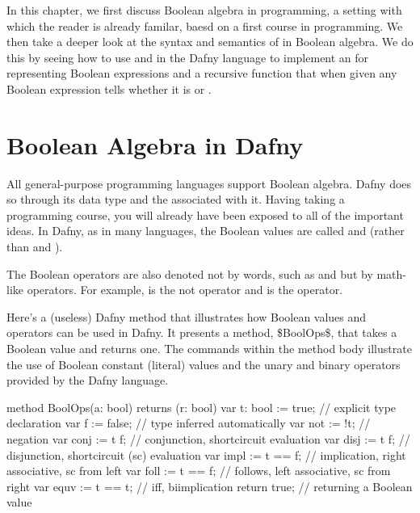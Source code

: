 \documentclass[letterpaper,10pt,english]{sphinxmanual}
\begin{document}
In this chapter, we first discuss Boolean algebra in programming, a
setting with which the reader is already familar, baesd on a first
course in programming. We then take a deeper look at the syntax and
semantics of  in Boolean algebra. We do this by seeing
how to use  and  in the
Dafny language to implement an  for representing
Boolean expressions and a recursive  function that when
given any Boolean expression tells whether it is  or .


\section{Boolean Algebra in Dafny}
\label{\detokenize{07-boolean-algebra:boolean-algebra-in-dafny}}
All general-purpose programming languages support Boolean
algebra. Dafny does so through its  data type and the
 associated with it. Having taking a programming course,
you will already have been exposed to all of the important ideas.
In Dafny, as in many languages, the Boolean values are called
 and  (rather than  and ).

The Boolean operators are also denoted not by words, such as  and
 but by math-like operators. For example, \sphinxstyleemphasis{!} is the not operator
and \sphinxstyleemphasis{\textbar{}\textbar{}} is the  operator.

Here’s a (useless) Dafny method that illustrates how Boolean values
and operators can be used in Dafny. It presents a method, \$BoolOps\$,
that takes a Boolean value and returns one. The commands within the
method body illustrate the use of Boolean constant (literal) values
and the unary and binary operators provided by the Dafny language.

\begin{sphinxVerbatim}[commandchars=\\\{\}]
method BoolOps(a: bool) returns (r: bool)
\PYGZob{}
    var t: bool := true;    // explicit type declaration
    var f := false;         // type inferred automatically
    var not := !t;          // negation
    var conj := t \PYGZam{}\PYGZam{} f;     // conjunction, short\PYGZhy{}circuit evaluation
    var disj := t \textbar{}\textbar{} f;     // disjunction, short\PYGZhy{}circuit (sc) evaluation
    var impl := t ==\PYGZgt{} f;    // implication, right associative, sc from left
    var foll := t \PYGZlt{}== f;    // follows, left associative, sc from right
    var equv := t \PYGZlt{}==\PYGZgt{} t;   // iff, bi\PYGZhy{}implication
    return true;            // returning a Boolean value
 \PYGZcb{}
\end{sphinxVerbatim}
\end{document}
